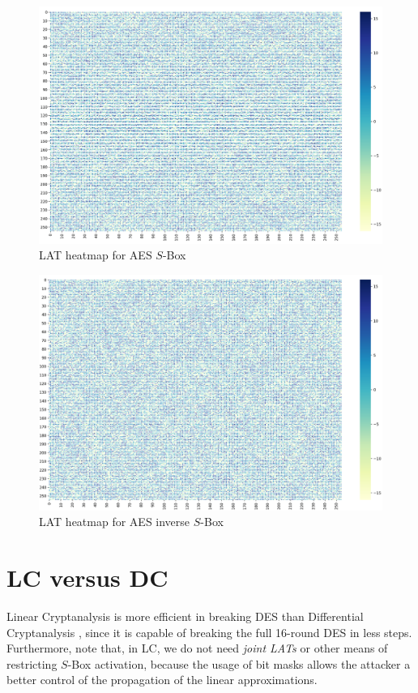 \documentclass{report}
\begin{document}
\begin{figure}
    \centering
    \includegraphics[scale=0.45]{lat_aes.png}
    \caption{LAT heatmap for AES $S$-Box}
    \label{fig:lat-aes}
\end{figure}

\begin{figure}
    \centering
    \includegraphics[scale=0.45]{lat_aes_inv.png}
    \caption{LAT heatmap for AES inverse $S$-Box}
    \label{fig:lat-aes-inv}
\end{figure}

\section{LC versus DC}
Linear Cryptanalysis is more efficient in breaking DES than Differential Cryptanalysis \cite{Shamir}, since it is capable of breaking the full 16-round DES in less steps. Furthermore, note that, in LC, we do not need \emph{joint LATs} or other means of restricting $S$-Box activation, because the usage of bit masks allows the attacker a better control of the propagation of the linear approximations. 
\end{document}
